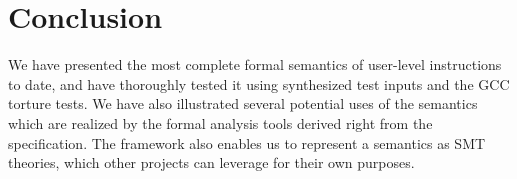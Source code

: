 \section{Conclusion}\label{sec:conc}
We have presented the most complete formal semantics of \ISA user-level instructions
to date, and have thoroughly tested it using synthesized test inputs and the GCC torture tests.
We have also illustrated several potential uses of the semantics which are realized by the formal analysis tools
derived right from the \K specification. 
The \K framework also enables us to represent a semantics as SMT theories,
which other projects can
leverage for their own purposes.





